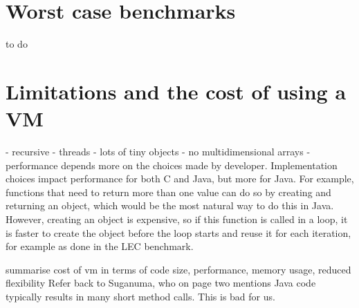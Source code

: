 \section{Worst case benchmarks}
to do




\section{Limitations and the cost of using a VM}
 - recursive
 - threads
 - lots of tiny objects
 - no multidimensional arrays
 - performance depends more on the choices made by developer. Implementation choices impact performance for both C and Java, but more for Java. For example, functions that need to return more than one value can do so by creating and returning an object, which would be the most natural way to do this in Java. However, creating an object is expensive, so if this function is called in a loop, it is faster to create the object before the loop starts and reuse it for each iteration, for example as done in the LEC benchmark.



summarise cost of vm in terms of code size, performance, memory usage, reduced flexibility
Refer back to Suganuma, who on page two mentions Java code typically results in many short method calls. This is bad for us.
